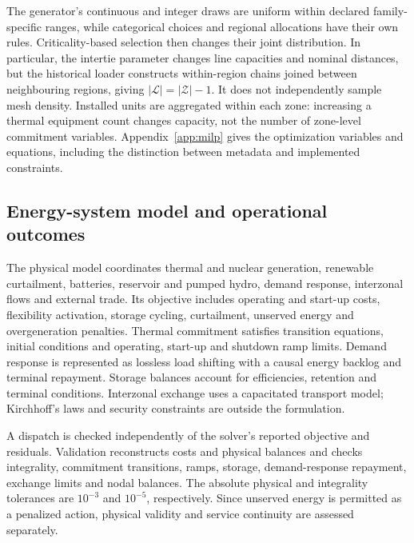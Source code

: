 The generator's continuous and integer draws are uniform within declared
family-specific ranges, while categorical choices and regional allocations
have their own rules. Criticality-based selection then changes their joint
distribution. In particular, the intertie parameter changes line capacities
and nominal distances, but the historical loader constructs within-region
chains joined between neighbouring regions, giving $|\mathcal L|=|\mathcal Z|-1$.
It does not independently sample mesh density. Installed units are aggregated
within each zone: increasing a thermal equipment count changes capacity,
not the number of zone-level commitment variables. Appendix~\ref{app:milp}
gives the optimization variables and equations, including the distinction
between metadata and implemented constraints.

\subsection{Energy-system model and operational outcomes}
The physical model coordinates thermal and nuclear generation, renewable
curtailment, batteries, reservoir and pumped hydro, demand response,
interzonal flows and external trade. Its objective includes operating and
start-up costs, flexibility activation, storage cycling, curtailment,
unserved energy and overgeneration penalties. Thermal commitment satisfies
transition equations, initial conditions and operating, start-up and shutdown
ramp limits. Demand response is represented as lossless load shifting with
a causal energy backlog and terminal repayment. Storage balances account
for efficiencies, retention and terminal conditions. Interzonal exchange
uses a capacitated transport model; Kirchhoff's laws and security constraints
are outside the formulation.

A dispatch is checked independently of the solver's reported objective and
residuals. Validation reconstructs costs and physical balances and checks
integrality, commitment transitions, ramps, storage, demand-response
repayment, exchange limits and nodal balances. The absolute physical and
integrality tolerances are $10^{-3}$ and $10^{-5}$, respectively. Since
unserved energy is permitted as a penalized action, physical validity and
service continuity are assessed separately.

